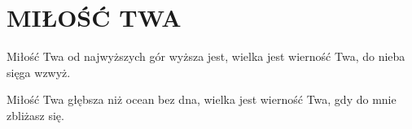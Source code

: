 \documentclass[../../../songbook.tex]{subfiles}
\begin{document}
\TabPositions{8cm} %
\section*{MIŁOŚĆ TWA}
{}
\vspace{0.5cm}
Miłość Twa							  \newline	
od najwyższych gór wyższa jest,	  \newline	
wielka jest wierność Twa,		   \newline	
do nieba sięga wzwyż.				  \newline	

Miłość Twa  \newline
głębsza niż ocean bez dna, \newline
wielka jest wierność Twa,  \newline
gdy do mnie zbliżasz się. \newline
\end{document}

